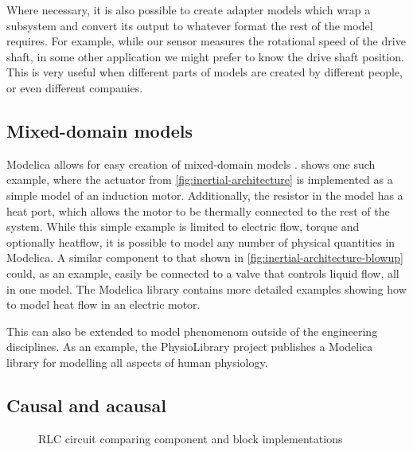 \documentclass[\rootfolder/main.tex]{subfiles}
\begin{document}
Where necessary, it is also possible to create adapter models which wrap a subsystem and convert its output to whatever format the rest of the model requires.
For example, while our sensor measures the rotational speed of the drive shaft, in some other application we might prefer to know the drive shaft position.
This is very useful when different parts of models are created by different people, or even different companies.

\subsection{Mixed-domain models}

Modelica allows for easy creation of mixed-domain models \cite{clauss2002}.
 shows one such example, where the actuator from \cref{fig:inertial-architecture} is implemented as a simple model of an induction motor.
Additionally, the resistor in the model has a heat port, which allows the motor to be thermally connected to the rest of the system.
While this simple example is limited to electric flow, torque and optionally heatflow, it is possible to model any number of physical quantities in Modelica.
A similar component to that shown in \cref{fig:inertial-architecture-blowup} could, as an example, easily be connected to a valve that controls liquid flow, all in one model.
The Modelica library contains more detailed examples showing how to model heat flow in an electric motor\footnotemark.

This can also be extended to model phenomenom outside of the engineering disciplines.
As an example, the PhysioLibrary project publishes a Modelica library for modelling all aspects of human physiology.


\subsection{Causal and acausal}

\begin{figure}[ht]
    \centering
        {
            \def\svgwidth{0.37\columnwidth}\tiny
            
        }
        {
            \def\svgwidth{0.60\columnwidth}\tiny
            
        }
    \caption{RLC circuit comparing component and block implementations}
    \label{fig:rlc}
\end{figure}
\end{document}
